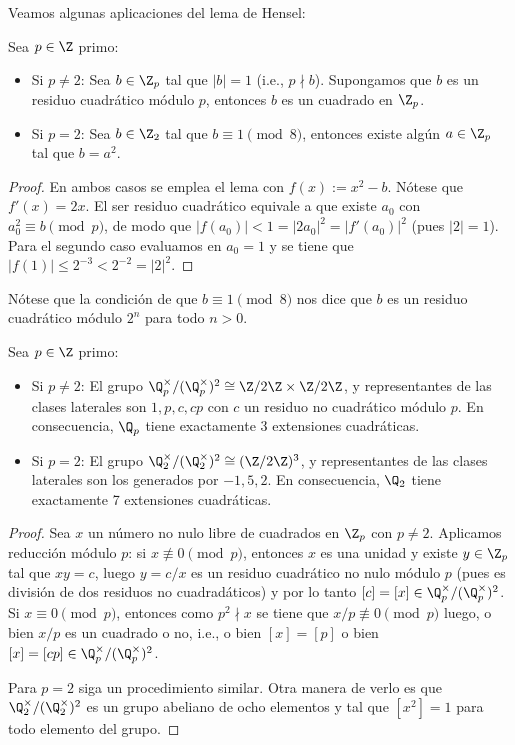 \documentclass[teoria-numeros.tex]{subfiles}
\begin{document}
Veamos algunas aplicaciones del lema de Hensel:
\begin{thm}
	Sea $p \in \Z$ primo:
	\begin{itemize}
		\item Si $p \ne 2$:
			Sea $b \in \Z_p$ tal que $|b| = 1$ (i.e., $p \nmid b$).
			Supongamos que $b$ es un residuo cuadrático módulo $p$, entonces $b$ es un cuadrado en $\Z_p$.
		\item Si $p = 2$:
			Sea $b \in \Z_2$ tal que $b \equiv 1 \pmod 8$, entonces existe algún $a \in \Z_p$ tal que $b = a^2$.
	\end{itemize}
\end{thm}
\begin{proof}
	En ambos casos se emplea el lema con $f(x) := x^2 - b$. Nótese que $f'(x) = 2x$.
	El ser residuo cuadrático equivale a que existe $a_0$ con $a_0^2 \equiv b \pmod p$, de modo que $|f(a_0)| < 1 = |2a_0|^2 = |f'(a_0)|^2$ (pues $|2| = 1$).
	Para el segundo caso evaluamos en $a_0 = 1$ y se tiene que $|f(1)| \le 2^{-3} < 2^{-2} = |2|^2$.
\end{proof}
Nótese que la condición de que $b \equiv 1 \pmod 8$ nos dice que $b$ es un residuo cuadrático módulo $2^n$ para todo $n > 0$.

\begin{cor}
	Sea $p \in \Z$ primo:
	\begin{itemize}
		\item Si $p \ne 2$:
			El grupo $\Q_p^\times / (\Q_p^\times)^2 \cong \Z/2\Z \times \Z/2\Z$,
			y representantes de las clases laterales son $1, p, c, cp$ con $c$ un residuo no cuadrático módulo $p$.
			En consecuencia, $\Q_p$ tiene exactamente 3 extensiones cuadráticas.
		\item Si $p = 2$:
			El grupo $\Q_2^\times / (\Q_2^\times)^2 \cong (\Z/2\Z)^3$,
			y representantes de las clases laterales son los generados por $-1, 5, 2$.
			En consecuencia, $\Q_2$ tiene exactamente 7 extensiones cuadráticas.
	\end{itemize}
\end{cor}
\begin{proof}
	Sea $x$ un número no nulo libre de cuadrados en $\Z_p$ con $p \ne 2$.
	Aplicamos reducción módulo $p$: si $x \not\equiv 0 \pmod p$, entonces $x$ es una unidad y existe $y \in \Z_p$ tal que
	$xy = c$, luego $y = c/x$ es un residuo cuadrático no nulo módulo $p$ (pues es división de dos residuos no cuadradáticos) y por lo tanto
	$[c] = [x] \in \Q_p^\times / (\Q_p^\times)^2$.
	Si $x \equiv 0 \pmod p$, entonces como $p^2 \nmid x$ se tiene que $x/p \not\equiv 0 \pmod p$ luego, o bien $x/p$ es un cuadrado
	o no, i.e., o bien $[x] = [p]$ o bien $[x] = [cp] \in \Q_p^\times / (\Q_p^\times)^2$.

	Para $p = 2$ siga un procedimiento similar.
	Otra manera de verlo es que $\Q_2^\times / (\Q_2^\times)^2$ es un grupo abeliano de ocho elementos y tal que $[x^2] = 1$ para todo elemento del grupo.
\end{proof}
\end{document}
